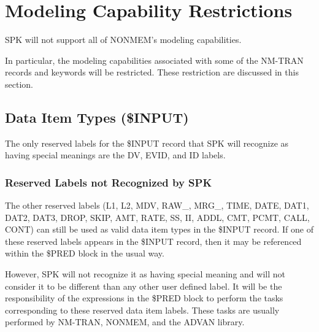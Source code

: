 \documentclass{article}
\begin{document}
%
%



%
\section{Modeling Capability Restrictions}
%

SPK will not support all of NONMEM's modeling capabilities.

In particular, the modeling capabilities associated with some 
of the NM-TRAN records and keywords will be restricted.
These restriction are discussed in this section.


\subsection{Data Item Types (\$INPUT)}

The only reserved labels for the \$INPUT record that SPK will
recognize as having special meanings are the DV, EVID, and
ID labels.


\subsubsection{Reserved Labels not Recognized by SPK}

The other reserved labels
(L1, L2, MDV, RAW\_, MRG\_, TIME, DATE, DAT1, DAT2, DAT3, 
DROP, SKIP, AMT, RATE, SS, II, ADDL, CMT, PCMT, CALL, CONT)
can still be used as valid 
data item types in the \$INPUT record.
If one of these reserved labels appears in the \$INPUT record, 
then it may  be referenced within the \$PRED block in the usual way.

However, SPK will not recognize it as having special meaning and will
not consider it to be different than any other user defined label.
It will be the responsibility of the expressions in the \$PRED block to 
perform the tasks corresponding to these reserved data item labels.
These tasks are usually performed by NM-TRAN, NONMEM, and the
ADVAN library.
\end{document}
